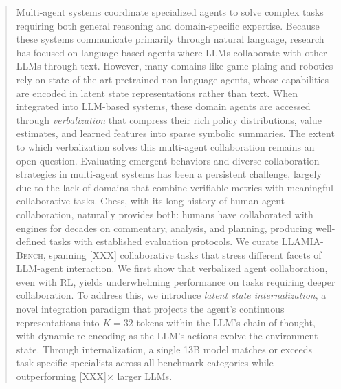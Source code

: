 \documentclass{article}
\theoremstyle{plain}
\theoremstyle{definition}
\theoremstyle{remark}
\begin{document}
\printAffiliationsAndNotice{}  %



\begin{abstract}
  Multi-agent systems coordinate specialized agents to solve complex tasks requiring both general reasoning and domain-specific expertise. Because these systems communicate primarily through natural language, research has focused on language-based agents where LLMs collaborate with other LLMs through text. However, many domains like game plaing and robotics rely on state-of-the-art pretrained non-language agents, whose capabilities are encoded in latent state representations rather than text. When integrated into LLM-based systems, these domain agents are accessed through \emph{verbalization} that compress their rich policy distributions, value estimates, and learned features into sparse symbolic summaries. The extent to which verbalization solves this multi-agent collaboration remains an open question.
  Evaluating emergent behaviors and diverse collaboration strategies in multi-agent systems has been a persistent challenge, largely due to the lack of domains that combine verifiable metrics with meaningful collaborative tasks. Chess, with its long history of human-agent collaboration, naturally provides both: humans have collaborated with engines for decades on commentary, analysis, and planning, producing well-defined tasks with established evaluation protocols. We curate \textsc{LLAMIA-Bench}, spanning [XXX] collaborative tasks that stress different facets of LLM-agent interaction. We first show that verbalized agent collaboration, even with RL, yields underwhelming performance on tasks requiring deeper collaboration. To address this, we introduce \textit{latent state internalization}, a novel integration paradigm that projects the agent's continuous representations into $K{=}32$ tokens within the LLM's chain of thought, with dynamic re-encoding as the LLM's actions evolve the environment state. Through internalization, a single 13B model matches or exceeds task-specific specialists across all benchmark categories while outperforming [XXX]$\times$ larger LLMs.
\end{abstract}
\end{document}
